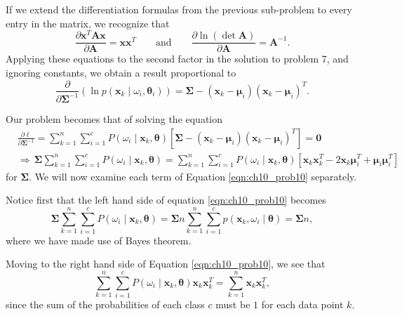 \documentclass[12pt, a4paper]{article}
\newcommand{\vect}[1]{\bm{#1}}
\begin{document}
{\begin{easylist}[enumerate]
If we extend the differentiation formulas from the previous sub-problem to every entry in the matrix, we recognize that
\begin{equation*}
	\frac{\partial \vect{x}^T \vect{A} \vect{x}}{\partial \vect{A}} = \vect{x} \vect{x}^T 
	\qquad \text{and} \qquad
	\frac{\partial \ln (\det \vect{A})}{\partial \vect{A}} =  \vect{A}^{-1}.
\end{equation*}
Applying these equations to the second factor in the solution to problem 7, and ignoring constants, we obtain a result proportional to
\begin{equation*}
	\frac{\partial }{\partial \vect{\Sigma}^{-1}} \left( \ln p \left( \vect{x}_k \mid \omega_i , \vect{\theta}_i \right) \right) = 
	\vect{\Sigma} - \left( \vect{x}_k - \vect{\mu}_i \right)\left( \vect{x}_k - \vect{\mu}_i \right)^T.
\end{equation*}

Our problem becomes that of solving the equation
\begin{align}
	\nonumber &\frac{\partial \ell }{\partial \vect{\Sigma}^{-1}}   =  
	\sum_{k=1}^{n} \sum_{i=1}^{c} P \left( \omega_i \mid \vect{x}_k, \vect{\theta}\right)
	\left[ \vect{\Sigma} - \left( \vect{x}_k - \vect{\mu}_i \right) \left( \vect{x}_k - \vect{\mu}_i \right)^T \right] = \vect{0} \\
	&  \Rightarrow  \,
	\vect{\Sigma} \sum_{k=1}^{n} \sum_{i=1}^{c} P \left( \omega_i \mid \vect{x}_k, \vect{\theta}\right)
	=
	\sum_{k=1}^{n} \sum_{i=1}^{c} P \left( \omega_i \mid \vect{x}_k, \vect{\theta}\right)
	\left[ \vect{x}_k \vect{x}_k^T - 2 \vect{x}_k \vect{\mu}_i^T + \vect{\mu}_i \vect{\mu}_i^T \right] \label{eqn:ch10_prob10}
\end{align}
for $\vect{\Sigma}$.
We will now examine each term of Equation \eqref{eqn:ch10_prob10} separately.

Notice first that the left hand side of equation \eqref{eqn:ch10_prob10} becomes
\begin{equation*}
	\vect{\Sigma}
	\sum_{k=1}^{n} \sum_{i=1}^{c} P 
	\left( \omega_i \mid \vect{x}_k, \vect{\theta}\right) 
	=
	\vect{\Sigma}n \sum_{k=1}^{n} \sum_{i=1}^{c} 
	 p \left(  \vect{x}_k, \omega_i \mid \vect{\theta} \right) 
	 =  \vect{\Sigma} n,
\end{equation*}
where we have made use of Bayes theorem.

Moving to the right hand side of Equation \eqref{eqn:ch10_prob10}, we see that
\begin{equation*}
	\sum_{k=1}^{n} \sum_{i=1}^{c} P \left( \omega_i \mid \vect{x}_k, \vect{\theta}\right)
	\vect{x}_k \vect{x}_k^T
	= 
	\sum_{k=1}^{n}
	\vect{x}_k \vect{x}_k^T,
\end{equation*}
since the sum of the probabilities of each class $c$ must be $1$ for each data point $k$.


\end{easylist}}
\end{document}
